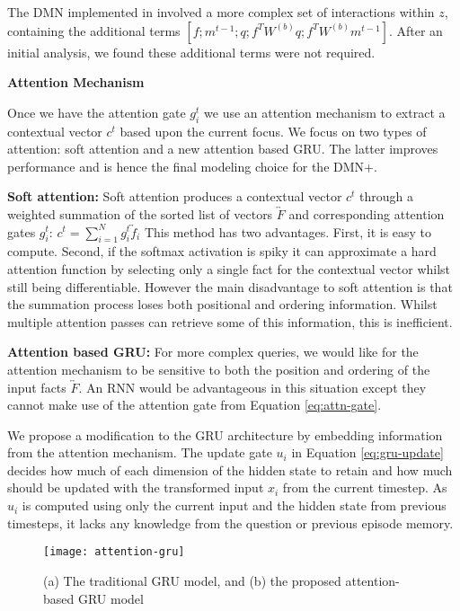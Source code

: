 \documentclass{article}
\begin{document}
The DMN implemented in \citet{Kumar2015} involved a more complex set of interactions within $z$, containing the additional terms $[f; m^{t-1}; q; f^T W^{(b)} q; f^T W^{(b)} m^{t-1}]$.
After an initial analysis, we found these additional terms were not required.

\textbf{Attention Mechanism}

Once we have the attention gate $g^t_i$ we use an attention mechanism to extract a contextual vector $c^t$ based upon the current focus.
We focus on two types of attention: soft attention and a new attention based GRU. The latter improves performance and is hence the final modeling choice for the DMN+.

\textbf{Soft attention:}
Soft attention produces a contextual vector $c^t$ through a weighted summation of the sorted list of vectors $\overleftrightarrow{F}$ and corresponding attention gates $g_i^t$: $c^t = \sum_{i=1}^N g^t_i \overleftrightarrow{f}_i$
This method has two advantages.
First, it is easy to compute.
Second, if the softmax activation is spiky it can approximate a hard attention function by selecting only a single fact for the contextual vector whilst still being differentiable.
However the main disadvantage to soft attention is that the summation process loses both positional and ordering information.
Whilst multiple attention passes can retrieve some of this information, this is inefficient.

\textbf{Attention based GRU:} \label{sec:attngru}
For more complex queries, we would like for the attention mechanism to be sensitive to both the position and ordering of the input facts $\overleftrightarrow{F}$.
An RNN would be advantageous in this situation except they cannot make use of the attention gate from Equation \ref{eq:attn-gate}.

We propose a modification to the GRU architecture by embedding information from the attention mechanism.
The update gate $u_i$ in Equation \ref{eq:gru-update} decides how much of each dimension of the hidden state to retain and how much should be updated with the transformed input $x_i$ from the current timestep.
As $u_i$ is computed using only the current input and the hidden state from previous timesteps, it lacks any knowledge from the question or previous episode memory.

\begin{figure}
\centering
\texttt{[image: attention-gru]}
\vspace{-0.3cm}
\caption{(a) The traditional GRU model, and (b) the proposed attention-based GRU model}
\vspace{-0.3cm}
\label{fig:attention}
\end{figure}
\end{document}
